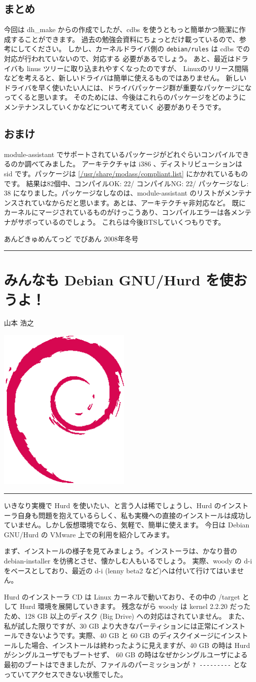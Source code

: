 \documentclass[mingoth,a4paper]{jsarticle}
\renewcommand{\dancersection}[2]{%
\newpage
あんどきゅめんてっど でびあん 2008年冬号
%
\vspace{0.1mm}\\
{\color{dancerlightblue}\rule{\hsize}{2mm}}

%
%
\begin{minipage}[t]{0.6\hsize}
\color{dancerdarkblue}
\vspace{1cm}
\section{#1}
\hfill{}#2\\
\end{minipage}
\begin{minipage}[t]{0.4\hsize}
\vspace{-2cm}
\hfill{}\includegraphics[height=8cm]{image200502/openlogo-nd.eps}\\
\vspace{-5cm}
\end{minipage}
%
%
{\color{dancerdarkblue}\rule{0.74\hsize}{2mm}}
%
\vspace{2cm}
}
\begin{document}
\subsection{まとめ}
今回は dh\_make からの作成でしたが、cdbs を使うともっと簡単かつ簡潔に作成することができます。
過去の勉強会資料にちょっとだけ載っているので、参考にしてください。
しかし、カーネルドライバ側の \texttt{debian/rules} は cdbs での対応が行われていないので、対応する
必要があるでしょう。
あと、最近はドライバも linus ツリーに取り込まれやすくなったのですが、
Linuxのリリース間隔などを考えると、新しいドライバは簡単に使えるものではありません。
新しいドライバを早く使いたい人には、ドライバパッケージ群が重要なパッケージになってくると思います。
そのためには、今後はこれらのパッケージをどのようにメンテナンスしていくかなどについて考えていく
必要がありそうです。

\subsection{おまけ}
module-assistant でサポートされているパッケージがどれぐらいコンパイルできるのか調べてみました。
アーキテクチャは i386 、ディストリビューションは sid です。パッケージは \ref{/usr/share/modass/compliant.list} にかかれているものです。
結果は82個中、コンパイルOK: 22/ コンパイルNG: 22/ パッケージなし: 38 になりました。パッケージなしなのは、module-assistant のリストがメンテナンスされていなからだと思います。あとは、アーキテクチャ非対応など。
既にカーネルにマージされているものがけっこうあり、コンパイルエラーは各メンテナがサボっているのでしょう。
これらは今後BTSしていくつもりです。


\dancersection{みんなも Debian GNU/Hurd を使おうよ！}{山本 浩之}
\label{sec:gnuhurdminnnade}

いきなり実機で Hurd を使いたい、と言う人は稀でしょうし、Hurd のインストーラ自身も問題を抱えているらしく、私も実機への直接のインストールは成功していません。しかし仮想環境でなら、気軽で、簡単に使えます。
今日は Debian GNU/Hurd の VMware 上での利用を紹介してみます。

まず、インストールの様子を見てみましょう。インストーラは、かなり昔の debian-installer を彷彿とさせ、懐かしむ人もいるでしょう。
実際、woody の d-i をベースとしており、最近の d-i (lenny beta2 など)へは付いて行けてはいません。

Hurd のインストーラ CD は Linux カーネルで動いており、その中の /target として Hurd 環境を展開していきます。
残念ながら woody は kernel 2.2.20 だったため、128 GB 以上のディスク (Big Drive) への対応はされていません。
また、私が試した限りですが、30 GB より大きなパーティションには正常にインストールできないようです。実際、40 GB と 60 GB 
のディスクイメージにインストールした場合、インストールは終わったように見えますが、40 GB の時は Hurd がシングルユーザでもブートせず、
60 GB の時はなぜかシングルユーザによる最初のブートはできましたが、ファイルのパーミッションが  \verb!? ---------! となっていてアクセスできない状態でした。
\end{document}
